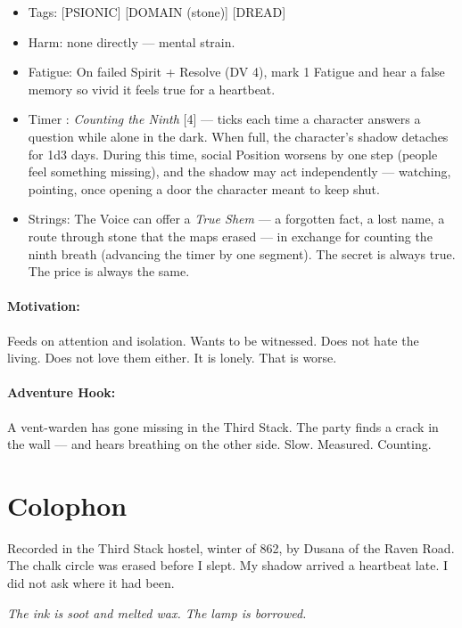 \begin{itemize}
\item Tags: [PSIONIC] [DOMAIN (stone)] [DREAD]
\item Harm: none directly --- mental strain.
\item Fatigue: On failed Spirit + Resolve (DV 4), mark 1 Fatigue and hear a false memory so vivid it feels true for a heartbeat.
\item Timer : \textit{Counting the Ninth} [4] --- ticks each time a character answers a question while alone in the dark. When full, the character's shadow detaches for 1d3 days. During this time, social Position worsens by one step (people feel something missing), and the shadow may act independently --- watching, pointing, once opening a door the character meant to keep shut.
\item Strings: The Voice can offer a \textit{True Shem} --- a forgotten fact, a lost name, a route through stone that the maps erased --- in exchange for counting the ninth breath (advancing the timer by one segment). The secret is always true. The price is always the same.
\end{itemize}

\paragraph{Motivation:}

Feeds on attention and isolation. Wants to be witnessed. Does not hate the living. Does not love them either. It is lonely. That is worse.

\paragraph{Adventure Hook:}

A vent-warden has gone missing in the Third Stack. The party finds a crack in the wall --- and hears breathing on the other side. Slow. Measured. Counting.

\section*{Colophon}

Recorded in the Third Stack hostel, winter of 862, by Dusana of the Raven Road. The chalk circle was erased before I slept. My shadow arrived a heartbeat late. I did not ask where it had been.

\noindent \textit{The ink is soot and melted wax. The lamp is borrowed.}